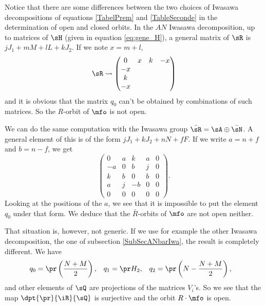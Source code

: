 Notice that there are some differences between the two choices of Iwasawa decompositions of equations \eqref{TabelPrem} and \eqref{TableSeconde} in the determination of open and closed orbits. In the $AN$ Iwasawa decomposition, up to matrices of $\sH$ (given in equation \eqref{eq:gene_H}), a general matrix of $\sR$ is $jJ_1+mM+lL+kJ_2$. If we note $x=m+l$,
\begin{equation} \label{eq:geneR}
\sR\leadsto
\begin{pmatrix}
0&x&k&-x\\
-x\\
k\\
-x
\end{pmatrix}
\end{equation}
and it is obvious that the matrix $q_0$ can't be obtained by combinations of such matrices. So the $R$-orbit of $\mfo$ is not open.

We can do the same computation with the Iwasawa group $\bar\sR=\sA\oplus\bar\sN$. A general element of this is of the form $jJ_1+kJ_2+nN+fF$. If we write $a=n+f$ and $b=n-f$, we get
\begin{equation}
	\begin{pmatrix}
 0	&	a	&	k	&	a	&	0\\ 
 -a	&	0	&	b	&	j	&	0\\ 
 k	&	b	&	0	&	b	&	0\\ 
 a	&	j	&	-b	&	0	&	0\\ 
0	&	0	&	0	&	0	&	0
 \end{pmatrix}.
\end{equation}
Looking at the positions of the $a$, we see that it is impossible to put the element $q_0$ under that form. We deduce that the $\bar R$-orbits of $\mfo$ are not open neither.

That situation is, however, not generic. If we use for example the other Iwasawa decomposition, the one of subsection \ref{SubSecANbarIwa}, the result is completely different. We have
\begin{align}
  q_{0}&=\pr\left( \frac{ N+M }{ 2 } \right),
&q_{1}&=\pr H_{2},
&q_{2}&=\pr\left( N-\frac{ N+M }{ 2 } \right),
\end{align}
and other elements of $\sQ$ are projections of the matrices $V_{i}$'s.  So we see that the map $\dpt{\pr}{\iR}{\sQ}$ is surjective and \label{pg:mfo_ouvert} the orbit $R\cdot\mfo$ is open.

